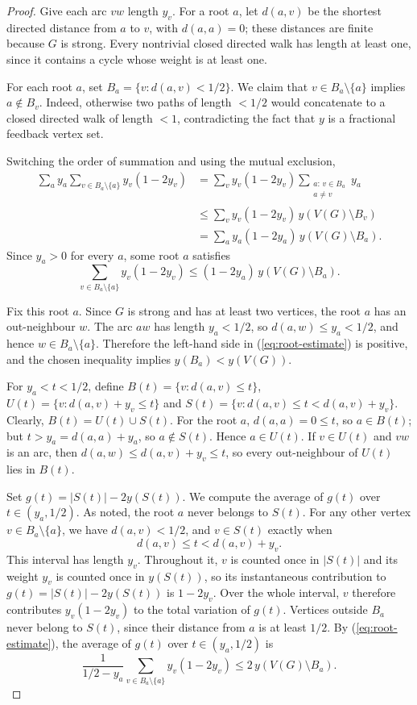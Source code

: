 \documentclass[a4paper,12pt]{article}
\numberwithin{equation}{section}
\newcommand{\jbjcomment}[1]{\textcolor{blue}{JBJ: #1}}
\begin{document}
\begin{proof}
Give each arc $vw$ length $y_v$. For a root $a$, let $d(a,v)$ be the
shortest directed distance from $a$ to $v$, with $d(a,a)=0$; these
distances are finite because $G$ is strong. Every nontrivial closed
directed walk has length at least one, since it contains a cycle whose
weight is at least one.

For each root $a$, set $B_a=\{v:d(a,v)<1/2\}$. We claim that
$v\in B_a\setminus\{a\}$ implies $a\notin B_v$. Indeed, otherwise two
paths of length $<1/2$ would concatenate to a closed directed walk of
length $<1$, contradicting the fact that  $y$ is a fractional feedback vertex set.

Switching the order of summation and using the mutual exclusion,
\begin{align*}
\sum_a y_a\sum_{v\in B_a\setminus\{a\}}y_v(1-2y_v)
&=\sum_v y_v(1-2y_v)\sum_{\substack{a:\,v\in B_a\\a\ne v}}y_a\\
&\le\sum_v y_v(1-2y_v)\,y(V(G)\setminus B_v)\\
&=\sum_a y_a(1-2y_a)\,y(V(G)\setminus B_a).
\end{align*}
Since $y_a>0$ for every $a$, some root $a$ satisfies
\begin{equation}\label{eq:root-estimate}
\sum_{v\in B_a\setminus\{a\}}y_v(1-2y_v)
\le(1-2y_a)\,y(V(G)\setminus B_a).
\end{equation}

Fix this root $a$. Since $G$ is strong and has at least two vertices, the root $a$ has an
out-neighbour $w$. The arc $aw$ has length $y_a<1/2$, so
$d(a,w)\le y_a<1/2$, and hence $w\in B_a\setminus\{a\}$. Therefore the
left-hand side in (\ref{eq:root-estimate}) is positive, and the chosen inequality implies
$y(B_a)<y(V(G))$. %

For $y_a<t<1/2$, define $B(t)=\{v:d(a,v)\le t\}$, $U(t)=\{v:d(a,v)+y_v\le t\}$ and $S(t)=\{v:d(a,v)\le t<d(a,v)+y_v\}$.  Clearly, $B(t)=U(t)\cup S(t)$. 
For the root $a$, $d(a,a)=0\le t$, so $a\in B(t)$; but
$t>y_a=d(a,a)+y_a$, so $a\notin S(t)$. Hence $a\in U(t)$.
 If $v\in U(t)$ and $vw$ is an arc, then
$d(a,w)\le d(a,v)+y_v\le t$, so every out-neighbour of $U(t)$ lies in
$B(t)$.

Set $g(t)=|S(t)|-2y(S(t))$. We compute the average of $g(t)$ over $t\in(y_a,1/2)$. As noted, the
root $a$ never belongs to $S(t)$. For any other vertex
$v\in B_a\setminus\{a\}$, we have $d(a,v)<1/2$, and $v\in S(t)$ exactly
when
$$
d(a,v)\le t<d(a,v)+y_v.
$$
This interval has length $y_v$. Throughout it, $v$ is counted once in
$|S(t)|$ and its weight $y_v$ is counted once in $y(S(t))$, so its
instantaneous contribution to $g(t)=|S(t)|-2y(S(t))$ is $1-2y_v$.
Over the whole interval, $v$ therefore contributes
$y_v(1-2y_v)$ to the total variation of $g(t)$. Vertices outside $B_a$
never belong to $S(t)$, since their distance from $a$ is at least $1/2$.
By (\ref{eq:root-estimate}), the average of $g(t)$ over $t\in(y_a,1/2)$ is
$$
\frac{1}{1/2-y_a}\sum_{v\in B_a\setminus\{a\}}y_v(1-2y_v)
\le 2\,y(V(G)\setminus B_a).
$$


\end{proof}
\end{document}

